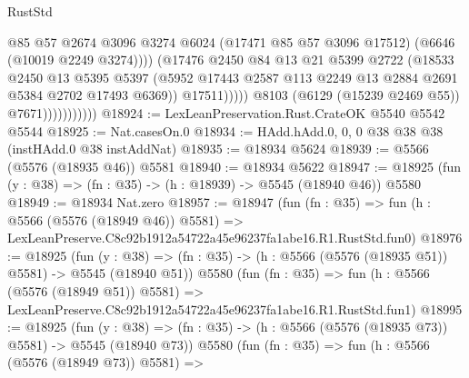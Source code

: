 \begin{lexlean}{RustStd}
\begin{coremodule}
                                      @85
                                      @57
                                      @2674
                                      @3096
                                      @3274
                                      @6024
                                      (@17471 @85 @57 @3096 @17512)
                                      (@6646 (@10019 @2249 @3274))))
                                  (@17476
                                    @2450
                                    @84
                                    @13
                                    @21
                                    @5399
                                    @2722
                                    (@18533
                                      @2450
                                      @13
                                      @5395
                                      @5397
                                      (@5952
                                        @17443
                                        @2587
                                        @113
                                        @2249
                                        @13
                                        @2884
                                        @2691
                                        @5384
                                        @2702
                                        @17493
                                        @6369))
                                    @17511)))))
                          @8103
                          (@6129 (@15239 @2469 @55))
                          @7671)))))))))))
@18924 := LexLeanPreservation.Rust.CrateOK @5540 @5542 @5544
@18925 := Nat.casesOn.{0}
@18934 := HAdd.hAdd.{0, 0, 0} @38 @38 @38 (instHAdd.{0} @38 instAddNat)
@18935 := @18934 @5624
@18939 := @5566 (@5576 (@18935 @46)) @5581
@18940 := @18934 @5622
@18947 := @18925 (fun (y : @38) => (fn : @35) -> (h : @18939) -> @5545 (@18940 @46)) @5580
@18949 := @18934 Nat.zero
@18957 := @18947
    (fun (fn : @35) =>
    fun (h : @5566 (@5576 (@18949 @46)) @5581) =>
    LexLeanPreserve.C8c92b1912a54722a45e96237fa1abe16.R1.RustStd.fun0)
@18976 := @18925
    (fun (y : @38) => (fn : @35) -> (h : @5566 (@5576 (@18935 @51)) @5581) -> @5545 (@18940 @51))
    @5580
    (fun (fn : @35) =>
    fun (h : @5566 (@5576 (@18949 @51)) @5581) =>
    LexLeanPreserve.C8c92b1912a54722a45e96237fa1abe16.R1.RustStd.fun1)
@18995 := @18925
    (fun (y : @38) => (fn : @35) -> (h : @5566 (@5576 (@18935 @73)) @5581) -> @5545 (@18940 @73))
    @5580
    (fun (fn : @35) =>
    fun (h : @5566 (@5576 (@18949 @73)) @5581) =>

\end{coremodule}
\end{lexlean}
